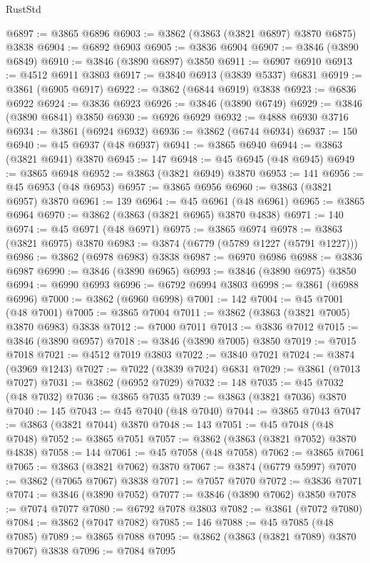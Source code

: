 \begin{lexlean}{RustStd}
\begin{coremodule}
@6897 := @3865 @6896
@6903 := @3862 (@3863 (@3821 @6897) @3870 @6875) @3838
@6904 := @6892 @6903
@6905 := @3836 @6904
@6907 := @3846 (@3890 @6849)
@6910 := @3846 (@3890 @6897) @3850
@6911 := @6907 @6910
@6913 := @4512 @6911 @3803
@6917 := @3840 @6913 (@3839 @5337) @6831
@6919 := @3861 (@6905 @6917)
@6922 := @3862 (@6844 @6919) @3838
@6923 := @6836 @6922
@6924 := @3836 @6923
@6926 := @3846 (@3890 @6749)
@6929 := @3846 (@3890 @6841) @3850
@6930 := @6926 @6929
@6932 := @4888 @6930 @3716
@6934 := @3861 (@6924 @6932)
@6936 := @3862 (@6744 @6934)
@6937 := 150
@6940 := @45 @6937 (@48 @6937)
@6941 := @3865 @6940
@6944 := @3863 (@3821 @6941) @3870
@6945 := 147
@6948 := @45 @6945 (@48 @6945)
@6949 := @3865 @6948
@6952 := @3863 (@3821 @6949) @3870
@6953 := 141
@6956 := @45 @6953 (@48 @6953)
@6957 := @3865 @6956
@6960 := @3863 (@3821 @6957) @3870
@6961 := 139
@6964 := @45 @6961 (@48 @6961)
@6965 := @3865 @6964
@6970 := @3862 (@3863 (@3821 @6965) @3870 @4838)
@6971 := 140
@6974 := @45 @6971 (@48 @6971)
@6975 := @3865 @6974
@6978 := @3863 (@3821 @6975) @3870
@6983 := @3874 (@6779 (@5789 @1227 (@5791 @1227)))
@6986 := @3862 (@6978 @6983) @3838
@6987 := @6970 @6986
@6988 := @3836 @6987
@6990 := @3846 (@3890 @6965)
@6993 := @3846 (@3890 @6975) @3850
@6994 := @6990 @6993
@6996 := @6792 @6994 @3803
@6998 := @3861 (@6988 @6996)
@7000 := @3862 (@6960 @6998)
@7001 := 142
@7004 := @45 @7001 (@48 @7001)
@7005 := @3865 @7004
@7011 := @3862 (@3863 (@3821 @7005) @3870 @6983) @3838
@7012 := @7000 @7011
@7013 := @3836 @7012
@7015 := @3846 (@3890 @6957)
@7018 := @3846 (@3890 @7005) @3850
@7019 := @7015 @7018
@7021 := @4512 @7019 @3803
@7022 := @3840 @7021
@7024 := @3874 (@3969 @1243)
@7027 := @7022 (@3839 @7024) @6831
@7029 := @3861 (@7013 @7027)
@7031 := @3862 (@6952 @7029)
@7032 := 148
@7035 := @45 @7032 (@48 @7032)
@7036 := @3865 @7035
@7039 := @3863 (@3821 @7036) @3870
@7040 := 145
@7043 := @45 @7040 (@48 @7040)
@7044 := @3865 @7043
@7047 := @3863 (@3821 @7044) @3870
@7048 := 143
@7051 := @45 @7048 (@48 @7048)
@7052 := @3865 @7051
@7057 := @3862 (@3863 (@3821 @7052) @3870 @4838)
@7058 := 144
@7061 := @45 @7058 (@48 @7058)
@7062 := @3865 @7061
@7065 := @3863 (@3821 @7062) @3870
@7067 := @3874 (@6779 @5997)
@7070 := @3862 (@7065 @7067) @3838
@7071 := @7057 @7070
@7072 := @3836 @7071
@7074 := @3846 (@3890 @7052)
@7077 := @3846 (@3890 @7062) @3850
@7078 := @7074 @7077
@7080 := @6792 @7078 @3803
@7082 := @3861 (@7072 @7080)
@7084 := @3862 (@7047 @7082)
@7085 := 146
@7088 := @45 @7085 (@48 @7085)
@7089 := @3865 @7088
@7095 := @3862 (@3863 (@3821 @7089) @3870 @7067) @3838
@7096 := @7084 @7095

\end{coremodule}
\end{lexlean}
